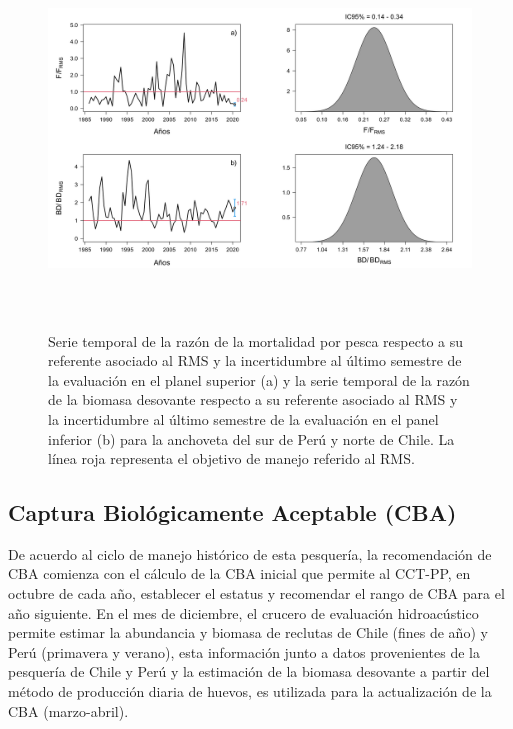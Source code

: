 \documentclass[letter,11pt]{article}
\begin{document}
\vspace{0.5cm}
\begin{figure}[htb!]
 \centering
 \includegraphics[width=14cm,height=10cm]{Figuras/figura7.pdf}
 \caption{Serie temporal de la raz\'on de la mortalidad por pesca respecto a su referente asociado al RMS y la incertidumbre al \'ultimo semestre de la evaluaci\'on en el planel superior (a) y la serie temporal de la raz\'on de la biomasa desovante respecto a su referente asociado al RMS y la incertidumbre al \'ultimo semestre de la evaluaci\'on en el panel inferior (b) para la anchoveta del sur de Per\'u y norte de Chile. La l\'inea roja representa el objetivo de manejo referido al RMS.}
 \label{Fig7}
\end{figure}


\subsection{Captura Biol\'ogicamente Aceptable (CBA)}

De acuerdo al ciclo de manejo hist\'orico de esta pesquer\'ia, la
recomendaci\'on de CBA comienza con el c\'alculo de la CBA inicial que
permite al CCT-PP, en octubre de cada a\~{n}o, establecer el estatus y
recomendar el rango de CBA para el a\~{n}o siguiente. En el mes de
diciembre, el crucero de evaluaci\'on hidroac\'ustico permite estimar la
abundancia y biomasa de reclutas de Chile (fines de a\~{n}o) y Per\'u
(primavera y verano), esta informaci\'on junto a datos provenientes de la
pesquer\'ia de Chile y Per\'u y la estimaci\'on de la biomasa desovante a
partir del m\'etodo de producci\'on diaria de huevos, es utilizada para la
actualizaci\'on de la CBA (marzo-abril).
\end{document}
